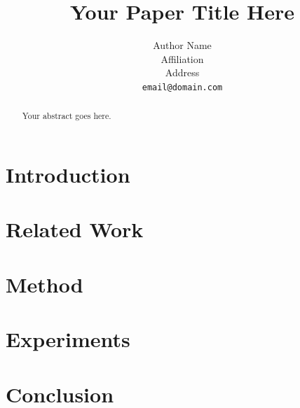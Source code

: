 \documentclass{article}
\title{Your Paper Title Here}
\author{%
  Author Name \\
  Affiliation \\
  Address \\
  \texttt{email@domain.com} \\
}
\begin{document}
\maketitle

\begin{abstract}
  Your abstract goes here.
\end{abstract}

\section{Introduction}

\section{Related Work}

\section{Method}

\section{Experiments}

\section{Conclusion}




\newpage
\appendix

\end{document}
